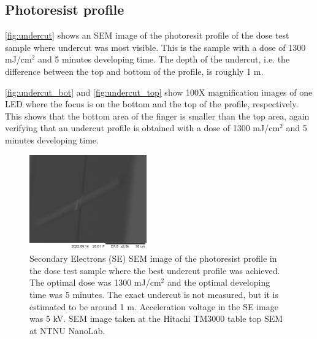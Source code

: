 
\subsection{Photoresist profile}

\noindent \autoref{fig:undercut} shows an SEM image of the photoresit profile of the dose test sample where undercut was most visible.
This is the sample with a dose of 1300 mJ/cm$^2$ and 5 minutes developing time.
The depth of the undercut, i.e. the difference between the top and bottom of the profile, is roughly 1 \textmu m.

\autoref{fig:undercut_bot} and \autoref{fig:undercut_top} show 100X magnification images of one LED where the focus is on the bottom and the top of the profile, respectively.
This shows that the bottom area of the finger is smaller than the top area, again verifying that an undercut profile is obtained with a dose of 1300 mJ/cm$^2$ and 5 minutes developing time.

\begin{figure}[ht]
    \centering
    \includegraphics[width=0.45\textwidth]{figures/Undercut_5min_1200mJcm-2.jpg}
    \caption{
        Secondary Electrons (SE) SEM image of the photoresist profile in the dose test sample where the best undercut profile was achieved.
        The optimal dose was 1300 mJ/cm$^2$ and the optimal developing time was 5 minutes.
        The exact undercut is not measured, but it is estimated to be around 1 \textmu m.
        Acceleration voltage in the SE image was 5 kV.
        SEM image taken at the Hitachi TM3000 table top SEM at NTNU NanoLab.
    }
    \label{fig:undercut}
\end{figure}

